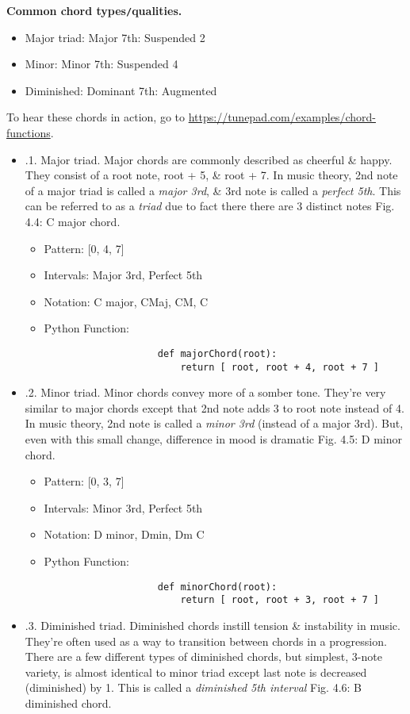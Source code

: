 \documentclass{article}
\begin{document}
\begin{itemize}
\begin{itemize}
		{\bf Common chord types{\tt/}qualities.}
		\begin{itemize}
			\item Major triad: Major 7th: Suspended 2
			\item Minor: Minor 7th: Suspended 4
			\item Diminished: Dominant 7th: Augmented
		\end{itemize}
		To hear these chords in action, go to \url{https://tunepad.com/examples/chord-functions}.
		\begin{itemize}
			\item {.1. Major triad.} Major chords are commonly described as cheerful \& happy. They consist of a root note, root + 5, \& root + 7. In music theory, 2nd note of a major triad is called a {\it major 3rd}, \& 3rd note is called a {\it perfect 5th}. This can be referred to as a {\it triad} due to fact there there are 3 distinct notes {\sf Fig. 4.4: C major chord.}
			\begin{itemize}
				\item Pattern: [0, 4, 7]
				\item Intervals: Major 3rd, Perfect 5th
				\item Notation: C major, CMaj, CM, C
				\item Python Function:
				\begin{verbatim}
					def majorChord(root):
					    return [ root, root + 4, root + 7 ]
				\end{verbatim}
			\end{itemize}
			\item {.2. Minor triad.} Minor chords convey more of a somber tone. They're very similar to major chords except that 2nd note adds 3 to root note instead of 4. In music theory, 2nd note is called a {\it minor 3rd} (instead of a major 3rd). But, even with this small change, difference in mood is dramatic {\sf Fig. 4.5: D minor chord.}
			\begin{itemize}
				\item Pattern: [0, 3, 7]
				\item Intervals: Minor 3rd, Perfect 5th
				\item Notation: D minor, Dmin, Dm C
				\item Python Function:
				\begin{verbatim}
					def minorChord(root):
					    return [ root, root + 3, root + 7 ]
				\end{verbatim}
			\end{itemize}
			\item {.3. Diminished triad.} Diminished chords instill tension \& instability in music. They're often used as a way to transition between chords in a progression. There are a few different types of diminished chords, but simplest, 3-note variety, is almost identical to minor triad except last note is decreased (diminished) by 1. This is called a {\it diminished 5th interval} {\sf Fig. 4.6: B diminished chord.}

\end{itemize}
\end{itemize}
\end{itemize}
\end{document}
